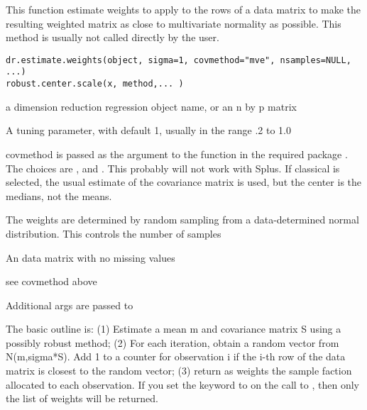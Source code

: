 \begin{Description}\relax
This function estimate weights to apply to the rows of a data matrix to
make the resulting weighted matrix as close to multivariate normality as
possible.  This method is usually not called directly by the user.\end{Description}
\begin{Usage}
\begin{verbatim}
dr.estimate.weights(object, sigma=1, covmethod="mve", nsamples=NULL, ...)
robust.center.scale(x, method,... )
\end{verbatim}
\end{Usage}
\begin{Arguments}
\begin{ldescription}
\item[\code{object}] a dimension reduction regression object name, or an n by p matrix
\item[\code{sigma}] A tuning parameter, with default 1, usually in the range .2
to 1.0
\item[\code{covmethod}] covmethod is passed as the argument  
to the function  in the required package
.  The choices are ,
 and .  This probably will not work with Splus.
If classical is selected, the usual estimate of the covariance matrix is
used, but the center is the medians, not the means.
\item[\code{nsamples}] The weights are determined by random sampling from a
data-determined normal distribution.  This controls the number of samples
\item[\code{x}] An  data matrix with no missing values
\item[\code{method}] see covmethod above
\item[\code{...}] Additional args are passed to 
\end{ldescription}
\end{Arguments}
\begin{Details}\relax
The basic outline is:  (1) Estimate a mean m and covariance matrix S using a
possibly robust method; (2) For each iteration, obtain a random vector
from N(m,sigma*S).  Add 1 to a counter for observation i if the i-th row
of the data matrix is closest to the random vector; (3) return as weights
the sample faction allocated to each observation.  If you set the keyword
 to  on the call to , then only the
list of weights will be returned.\end{Details}
